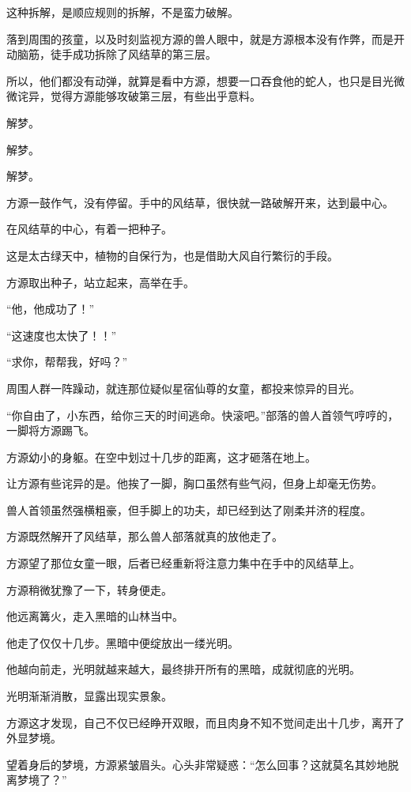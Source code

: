 \begin{this_body}
这种拆解，是顺应规则的拆解，不是蛮力破解。

落到周围的孩童，以及时刻监视方源的兽人眼中，就是方源根本没有作弊，而是开动脑筋，徒手成功拆除了风结草的第三层。

所以，他们都没有动弹，就算是看中方源，想要一口吞食他的蛇人，也只是目光微微诧异，觉得方源能够攻破第三层，有些出乎意料。

解梦。

解梦。

解梦。

方源一鼓作气，没有停留。手中的风结草，很快就一路破解开来，达到最中心。

在风结草的中心，有着一把种子。

这是太古绿天中，植物的自保行为，也是借助大风自行繁衍的手段。

方源取出种子，站立起来，高举在手。

“他，他成功了！”

“这速度也太快了！！”

“求你，帮帮我，好吗？”

周围人群一阵躁动，就连那位疑似星宿仙尊的女童，都投来惊异的目光。

“你自由了，小东西，给你三天的时间逃命。快滚吧。”部落的兽人首领气哼哼的，一脚将方源踢飞。

方源幼小的身躯。在空中划过十几步的距离，这才砸落在地上。

让方源有些诧异的是。他挨了一脚，胸口虽然有些气闷，但身上却毫无伤势。

兽人首领虽然强横粗豪，但手脚上的功夫，却已经到达了刚柔并济的程度。

方源既然解开了风结草，那么兽人部落就真的放他走了。

方源望了那位女童一眼，后者已经重新将注意力集中在手中的风结草上。

方源稍微犹豫了一下，转身便走。

他远离篝火，走入黑暗的山林当中。

他走了仅仅十几步。黑暗中便绽放出一缕光明。

他越向前走，光明就越来越大，最终排开所有的黑暗，成就彻底的光明。

光明渐渐消散，显露出现实景象。

方源这才发现，自己不仅已经睁开双眼，而且肉身不知不觉间走出十几步，离开了外显梦境。

望着身后的梦境，方源紧皱眉头。心头非常疑惑：“怎么回事？这就莫名其妙地脱离梦境了？”


\end{this_body}
